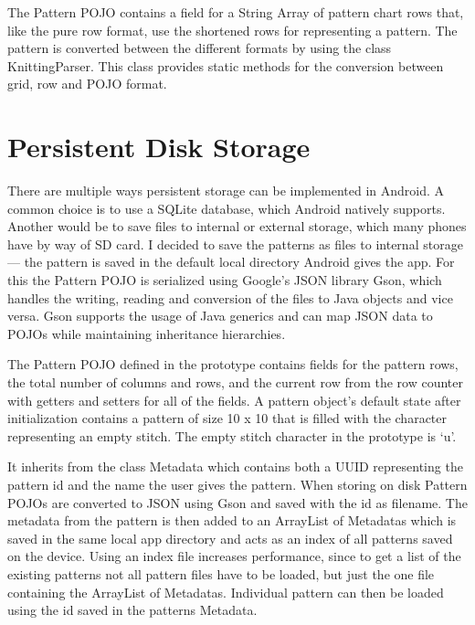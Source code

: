 The Pattern POJO contains a field for a String Array of pattern chart rows that, like the pure row format, use the shortened rows for representing a pattern.
The pattern is converted between the different formats by using the class KnittingParser. This class provides static methods for the conversion between grid, row and POJO format.

\section{Persistent Disk Storage}
There are multiple ways persistent storage can be implemented in Android. A common choice is to use a SQLite database, which Android natively supports. Another would be to save files to internal or external storage, which many phones have by way of SD card.
I decided to save the patterns as files to internal storage --- the pattern is saved in the default local directory Android gives the app. For this the Pattern POJO is serialized using Google’s JSON library Gson, which handles the writing, reading and conversion of the files to Java objects and vice versa. Gson supports the usage of Java generics and can map JSON data to POJOs while maintaining inheritance hierarchies.

The Pattern POJO defined in the prototype contains fields for the pattern rows, the total number of columns and rows, and the current row from the row counter with getters and setters for all of the fields. A pattern object’s default state after initialization contains a pattern of size 10 x 10 that is filled with  the character representing an empty stitch. The empty stitch character in the prototype is ‘u’.

It inherits from the class Metadata which contains both a UUID representing the pattern id and the name the user gives the pattern. When storing on disk Pattern POJOs are converted to JSON using Gson and saved with the id as filename. The metadata from the pattern is then added to an ArrayList of Metadatas which is saved in the same local app directory and acts as an index of all patterns saved on the device. Using an index file increases performance, since to get a list of the existing patterns not all pattern files have to be loaded, but just the one file containing the ArrayList of Metadatas. Individual pattern can then be loaded using the id saved in the patterns Metadata.

